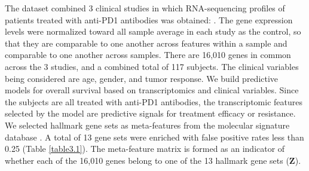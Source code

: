 The dataset combined 3 clinical studies in which RNA-sequencing profiles of patients treated with anti-PD1 antibodies was obtained: \cite{gide2019distinct, riaz2017tumor, hugo2016genomic}. The gene expression levels were normalized toward all sample average in each study as the control, so that they are comparable to one another across features within a sample and comparable to one another across samples. There are 16,010 genes in common across the 3 studies, and a combined total of 117 subjects. The clinical variables being considered are age, gender, and tumor response. We build predictive models for overall survival based on transcriptomics and clinical variables. Since the subjects are all treated with anti-PD1 antibodies, the transcriptomic features selected by the model are predictive signals for treatment efficacy or resistance. We selected hallmark gene sets as meta-features from the molecular signature database  \citep{liberzon2015molecular}. A total of 13 gene sets were enriched \citep{subramanian2005gene} with false positive rates less than 0.25 (Table \ref{table3.1}). The meta-feature matrix is formed as an indicator of whether each of the 16,010 genes belong to one of the 13 hallmark gene sets ($\bm{Z}$). 

